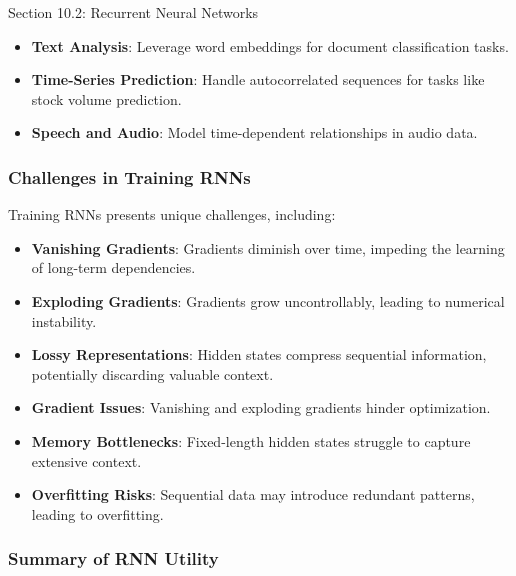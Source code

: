 \begin{notes}{Section 10.2: Recurrent Neural Networks}
    \begin{highlight}
        \begin{itemize}
            \item \textbf{Text Analysis}: Leverage word embeddings for document classification tasks.
            \item \textbf{Time-Series Prediction}: Handle autocorrelated sequences for tasks like stock volume prediction.
            \item \textbf{Speech and Audio}: Model time-dependent relationships in audio data.
        \end{itemize}
    \end{highlight}
    
    \subsubsection*{Challenges in Training RNNs}
    
    Training RNNs presents unique challenges, including:
    \begin{itemize}
        \item \textbf{Vanishing Gradients}: Gradients diminish over time, impeding the learning of long-term dependencies.
        \item \textbf{Exploding Gradients}: Gradients grow uncontrollably, leading to numerical instability.
        \item \textbf{Lossy Representations}: Hidden states compress sequential information, potentially discarding valuable context.
    \end{itemize}
    
    \begin{highlight}
        \begin{itemize}
            \item \textbf{Gradient Issues}: Vanishing and exploding gradients hinder optimization.
            \item \textbf{Memory Bottlenecks}: Fixed-length hidden states struggle to capture extensive context.
            \item \textbf{Overfitting Risks}: Sequential data may introduce redundant patterns, leading to overfitting.
        \end{itemize}
    \end{highlight}
    
    \subsubsection*{Summary of RNN Utility}
    

\end{notes}
